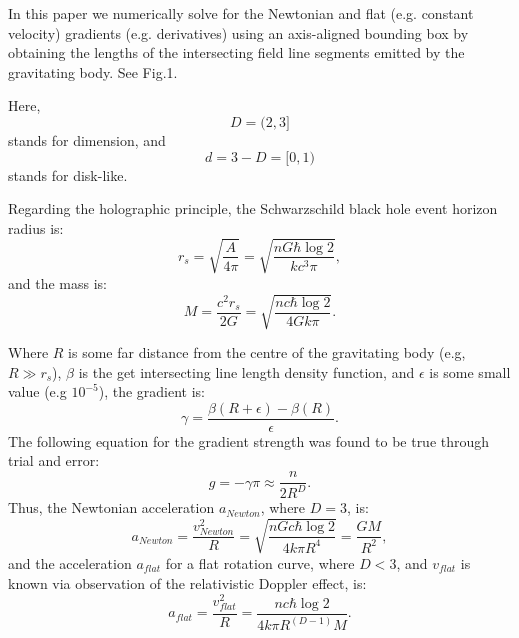 \documentclass[12pt]{article}
\begin{document}
In this paper we numerically solve for the Newtonian and flat (e.g. constant velocity) gradients (e.g. derivatives) using an axis-aligned bounding box by obtaining the lengths of the intersecting field line segments emitted by the gravitating body. See Fig.1. 

Here, 
\begin{equation}
D = (2, 3]
\end{equation}
stands for dimension, and 
\begin{equation}
d = 3 - D = [0, 1)
\end{equation}
stands for disk-like.

Regarding the holographic principle, the Schwarzschild black hole event horizon radius is:
\begin{equation}
r_s = \sqrt{\frac{A}{4 \pi}} = \sqrt{\frac{n G \hbar \log 2}{k c^3 \pi}},
\end{equation}
and the mass is:
\begin{equation}
M = \frac{c^2 r_s}{2 G} = \sqrt{\frac{n c \hbar \log 2}{4 G k \pi}}. 
\end{equation}

Where $R$ is some far distance from the centre of the gravitating body (e.g, $R \gg r_s$), $\beta$ is the get intersecting line length density function, and $\epsilon$ is some small value (e.g $10^{-5}$), the gradient is:
\begin{equation}
\gamma = \frac{\beta(R + \epsilon) - \beta(R)}{\epsilon}.
\end{equation}
The following equation for the gradient strength was found to be true through trial and error:
\begin{equation}
g = -\gamma \pi \approx \frac{n}{2 R^D}.
\end{equation}
Thus, the Newtonian acceleration $a_{\textit{Newton}}$, where $D = 3$, is:
\begin{equation}
a_{\textit{Newton}} = \frac{v_{\textit{Newton}}^2}{R} = \sqrt{\frac{n G c \hbar \log 2}{4 k \pi R^4}} = \frac{GM}{R^2},
\end{equation}
and the acceleration $a_{\textit{flat}}$ for a flat rotation curve, where $D < 3$, and $v_{\textit{flat}}$ is known via observation of the relativistic Doppler effect, is:
\begin{equation}
a_{\textit{flat}} = \frac{v_{\textit{flat}}^2}{R} = \frac{n c \hbar \log 2}{4 k \pi R^{(D - 1)} M}.
\end{equation}
\end{document}
